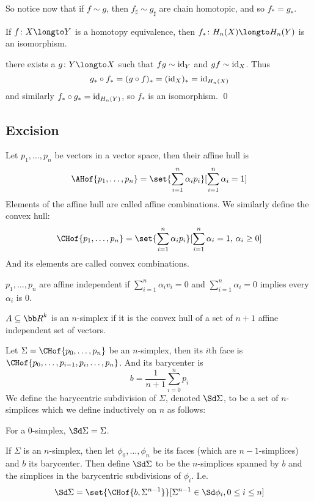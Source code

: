So notice now that if $f\sim g$, then $f_\sharp\sim g_\sharp$ are chain homotopic, and so $f_*=g_*$.

\bcoro

    If $f\colon X\longto Y$ is a homotopy equivalence, then $f_*\colon H_n(X)\longto H_n(Y)$ is an isomorphism.

\ecoro

\Proof there exists a $g\colon Y\longto X$ such that $fg\sim{\rm id}_Y$ and $gf\sim{\rm id}_X$.
Thus
$$ g_*\circ f_* = (g\circ f)_* = ({\rm id}_X)_* = {\rm id}_{H_n(X)} $$
and similarly $f_*\circ g_*={\rm id}_{H_n(Y)}$, so $f_*$ is an isomorphism.
\qed

\subsection{Excision}

\bdefn

    Let $p_1,\dots,p_n$ be vectors in a vector space, then their {\emphcolor affine hull} is
    $$ \AHof{p_1,\dots,p_n} = \set{\sum_{i=1}^n\alpha_ip_i}[\sum_{i=1}^n\alpha_i=1] $$
    Elements of the affine hull are called {\emphcolor affine combinations}.
    We similarly define the {\emphcolor convex hull}:
    $$ \CHof{p_1,\dots,p_n} = \set{\sum_{i=1}^n\alpha_ip_i}[\sum_{i=1}^n\alpha_i=1,\,\alpha_i\geq0] $$
    And its elements are called {\emphcolor convex combinations}.

\edefn

\bdefn

    $p_1,\dots,p_n$ are {\emphcolor affine independent} if $\sum_{i=1}^n\alpha_iv_i=0$ and $\sum_{i=1}^n\alpha_i=0$ implies every $\alpha_i$ is $0$.

\edefn

\bdefn

    $A\subseteq{\bb R}^k$ is an {\emphcolor $n$-simplex} if it is the convex hull of a set of $n+1$ affine independent set of vectors.

\edefn

\bdefn

    Let $\Sigma=\CHof{p_0,\dots,p_n}$ be an $n$-simplex, then its $i$th {\emphcolor face} is $\CHof{p_0,\dots,p_{i-1},p_i,\dots,p_n}$.
    And its {\emphcolor barycenter} is
    $$ b = \frac1{n+1}\sum_{i=0}^np_i $$
    We define the {\emphcolor barycentric subdivision} of $\Sigma$, denoted $\Sd\Sigma$, to be a set of $n$-simplices which we define inductively on $n$ as follows:
    \benum
        \item For a $0$-simplex, $\Sd\Sigma=\Sigma$.
        \item If $\Sigma$ is an $n$-simplex, then let $\phi_0,\dots,\phi_n$ be its faces (which are $n-1$-simplices) and $b$ its barycenter.
            Then define $\Sd\Sigma$ to be the $n$-simplices spanned by $b$ and the simplices in the barycentric subdivisions of $\phi_i$.
            I.e.
            $$ \Sd\Sigma = \set{\CHof{b,\Sigma^{n-1}}}[\Sigma^{n-1}\in\Sd\phi_i,0\leq i\leq n] $$
    \eenum

